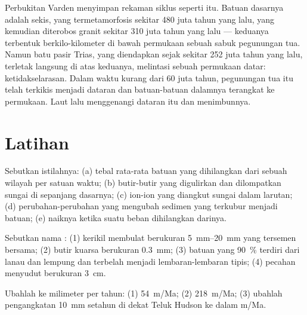Perbukitan Varden menyimpan rekaman siklus seperti itu. Batuan dasarnya adalah
sekis, yang termetamorfosis sekitar 480 juta tahun yang lalu, yang kemudian
diterobos granit sekitar 310 juta tahun yang lalu --- keduanya terbentuk
berkilo-kilometer di bawah permukaan sebuah sabuk pegunungan tua. Namun batu
pasir Trias, yang diendapkan sejak sekitar 252 juta tahun yang lalu, terletak
langsung di atas keduanya, melintasi sebuah permukaan datar: ketidakselarasan.
Dalam waktu kurang dari 60 juta tahun, pegunungan tua itu telah terkikis
menjadi dataran dan batuan-batuan dalamnya terangkat ke permukaan. Laut lalu
menggenangi dataran itu dan menimbunnya.

\section{Latihan}

\begin{exercise}[$\star$]\label{exo:g12:destruction-of-mountains:1}
Sebutkan istilahnya: (a) tebal rata-rata batuan yang dihilangkan dari sebuah
wilayah per satuan waktu; (b) butir-butir yang digulirkan dan dilompatkan sungai
di sepanjang dasarnya; (c) ion-ion yang diangkut sungai dalam larutan;
(d) perubahan-perubahan yang mengubah sedimen yang terkubur menjadi batuan;
(e) naiknya  ketika suatu beban dihilangkan darinya.
\end{exercise}

\begin{exercise}[$\star$]\label{exo:g12:destruction-of-mountains:2}
Sebutkan nama : (1) kerikil membulat berukuran
\qtyrange{5}{20}{mm} yang tersemen bersama; (2) butir kuarsa berukuran
\qty{0.3}{mm}; (3) batuan yang \qty{90}{\percent} terdiri dari lanau dan
lempung dan terbelah menjadi lembaran-lembaran tipis; (4) pecahan menyudut
berukuran \qty{3}{cm}.
\end{exercise}

\begin{exercise}[$\star$]\label{exo:g12:destruction-of-mountains:3}
Ubahlah ke milimeter per tahun: (1) \qty{54}{m/Ma}; (2) \qty{218}{m/Ma};
(3) ubahlah pengangkatan \qty{10}{mm} setahun di dekat Teluk Hudson ke dalam
\unit{m/Ma}.
\end{exercise}


